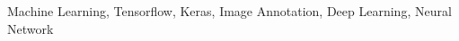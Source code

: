 \documentclass[conference, a4paper]{bibliography/IEEEtran-modified}
\begin{document}



\begin{keywords}
Machine Learning, Tensorflow, Keras, Image Annotation, Deep Learning, Neural Network
\end{keywords}





















% 

%
%
%

\end{document}
